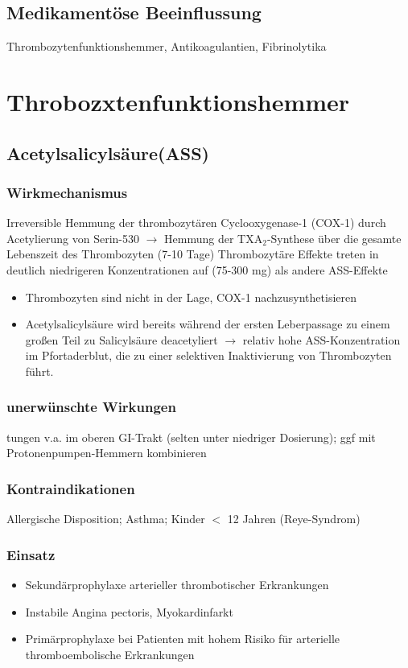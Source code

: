 \documentclass[10pt,a4paper]{report}
\begin{document}
\subsection{Medikamentöse Beeinflussung} %
\label{ssub:medikament_se_beeinflussung}
Thrombozytenfunktionshemmer, Antikoagulantien, Fibrinolytika
\section{Throbozxtenfunktionshemmer} %
\label{sec:throbozxtenfunktionshemmer}
\subsection{Acetylsalicylsäure(ASS)} %
\label{ssub:acetylsalicyls_ure}
\subsubsection{Wirkmechanismus} %
\label{par:wirkmechan}
Irreversible Hemmung der thrombozytären Cyclooxygenase-1 (COX-1) durch Acetylierung von Serin-530 $\rightarrow$ Hemmung der TXA$_2$-Synthese über die gesamte Lebenszeit des Thrombozyten (7-10 Tage)
Thrombozytäre Effekte treten in deutlich niedrigeren Konzentrationen auf (75-300 mg) als andere ASS-Effekte
\begin{itemize}
	\item Thrombozyten sind nicht in der Lage, 
	COX-1 nachzusynthetisieren
	\item Acetylsalicylsäure wird bereits während der ersten Leberpassage zu einem großen Teil zu Salicylsäure deacetyliert $\rightarrow$ relativ hohe ASS-Konzentration im Pfortaderblut, die zu einer selektiven Inaktivierung von Thrombozyten führt.
\end{itemize}
\subsubsection{unerwünschte Wirkungen} %
\label{par:paragraph_name}
tungen v.a. im oberen GI-Trakt (selten unter niedriger Dosierung); ggf mit Protonenpumpen-Hemmern kombinieren
\subsubsection{Kontraindikationen} %
\label{par:kontraindikationen}
Allergische Disposition; Asthma; Kinder $<$ 12 Jahren (Reye-Syndrom)
\subsubsection{Einsatz} %
\label{par:einsatz}
\begin{itemize}
	\item  Sekundärprophylaxe arterieller thrombotischer Erkrankungen
	\item Instabile Angina pectoris, Myokardinfarkt
	\item Primärprophylaxe bei Patienten mit hohem Risiko für arterielle thromboembolische Erkrankungen
\end{itemize}
\end{document}

